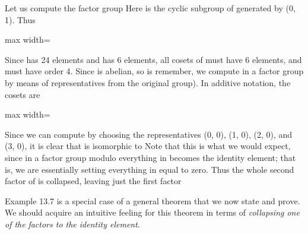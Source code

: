 \documentclass[11pt,oneside]{article}
\begin{document}
\begin{BookBody}
 Let us compute the factor group  Here  is the cyclic subgroup  of  generated by (0, 1). Thus

\begin{center}\begin{adjustbox}{max width=\linewidth}\end{adjustbox}\end{center}

\noindent Since  has 24 elements and  has 6 elements, all cosets of  must have 6 elements, and  must have order 4. Since  is abelian, so is remember, we compute in a factor group by means of representatives from the original group). In additive notation, the cosets are

\begin{center}\begin{adjustbox}{max width=\linewidth}\end{adjustbox}\end{center}

\noindent Since we can compute by choosing the representatives (0, 0), (1, 0), (2, 0), and (3, 0), it is clear that  is isomorphic to  Note that this is what we would expect, since in a factor group modulo  everything in  becomes the identity element; that is, we are essentially setting everything in  equal to zero. Thus the whole second factor  of  is collapsed, leaving just the first factor \BookEnd{\blacktriangle}

Example 13.7 is a special case of a general theorem that we now state and prove. We should acquire an intuitive feeling for this theorem in terms of\textit{ collapsing one of the} \textit{factors to the identity element}.


\end{BookBody}
\end{document}
